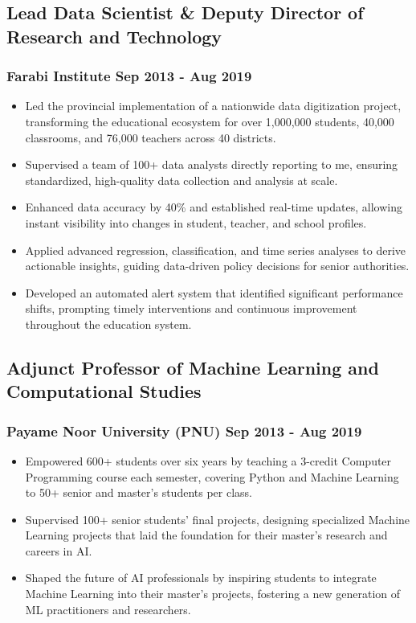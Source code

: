 \documentclass[11pt]{article}
\begin{document}
\subsection{Lead Data Scientist \& Deputy Director of Research and Technology}
\subsubsection{Farabi Institute \hfill Sep 2013 - Aug 2019}
\begin{itemize}[itemsep=5pt]
	\item Led the provincial implementation of a nationwide data digitization project, transforming the educational ecosystem for over 1,000,000 students, 40,000 classrooms, and 76,000 teachers across 40 districts.
	\item Supervised a team of 100+ data analysts directly reporting to me, ensuring standardized, high-quality data collection and analysis at scale. 
	\item Enhanced data accuracy by 40\% and established real-time updates, allowing instant visibility into changes in student, teacher, and school profiles.
	\item Applied advanced regression, classification, and time series analyses to derive actionable insights, guiding data-driven policy decisions for senior authorities.
	\item Developed an automated alert system that identified significant performance shifts, prompting timely interventions and continuous improvement throughout the education system.
\end{itemize}

\subsection{Adjunct Professor of Machine Learning and Computational Studies}
\subsubsection{Payame Noor University (PNU) \hfill Sep 2013 - Aug 2019}
\begin{itemize}[itemsep=5pt]
	\item Empowered 600+ students over six years by teaching a 3-credit Computer Programming course each semester, covering Python and Machine Learning to 50+ senior and master's students per class.
	\item Supervised 100+ senior students' final projects, designing specialized Machine Learning projects that laid the foundation for their master's research and careers in AI.
	\item Shaped the future of AI professionals by inspiring students to integrate Machine Learning into their master's projects, fostering a new generation of ML practitioners and researchers.
\end{itemize} 
\end{document}
